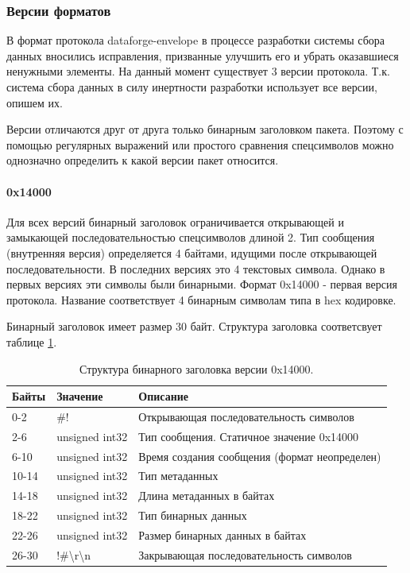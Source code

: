 \documentclass[a4paper,14pt]{extreport}
\begin{document}
\subsubsection{Версии форматов}
В формат протокола dataforge-envelope в процессе разработки системы сбора данных вносились исправления, призванные улучшить его и убрать оказавшиеся ненужными элементы. На данный момент существует 3 версии протокола. Т.к. система сбора данных в силу инертности разработки использует все версии, опишем их. 

Версии отличаются друг от друга только бинарным заголовком пакета. Поэтому с помощью регулярных выражений или простого сравнения спецсимволов можно однозначно определить к какой версии пакет относится.

\paragraph{0x14000}
Для всех версий бинарный заголовок ограничивается открывающей и замыкающей последовательностью спецсимволов длиной 2. Тип сообщения (внутренняя версия) определяется 4 байтами, идущими после открывающей последовательности. В последних версиях это 4 текстовых символа. Однако в первых версиях эти символы были бинарными. Формат 0x14000 - первая версия протокола. Название соответствует 4 бинарным символам типа в hex кодировке.

Бинарный заголовок имеет размер 30 байт. Структура заголовка соответсвует таблице \ref{tab:01400-binary-structure}.
\begin{table}
    \centering
    \begin{tabular}{|l|l|l|}
    \hline
    Байты & Значение & Описание \\
    \hline
    0-2 & \#! & Открывающая последовательность символов \\
    \hline
    2-6 & unsigned int32 & Тип сообщения. Статичное значение 0x14000 \\
    \hline
    6-10 & unsigned int32 & Время создания сообщения (формат неопределен) \\
    \hline
    10-14 & unsigned int32 & Тип метаданных \\
    \hline
    14-18 & unsigned int32 & Длина метаданных в байтах \\
    \hline
    18-22 & unsigned int32 & Тип бинарных данных \\
    \hline
    22-26 & unsigned int32 & Размер бинарных данных в байтах \\
    \hline
    26-30 & !\#\textbackslash  r\textbackslash n & Закрывающая последовательность символов \\
    \hline
    \end{tabular}
    \caption{Структура бинарного заголовка версии 0x14000.}
    \label{tab:01400-binary-structure}
\end{table}
\end{document}
